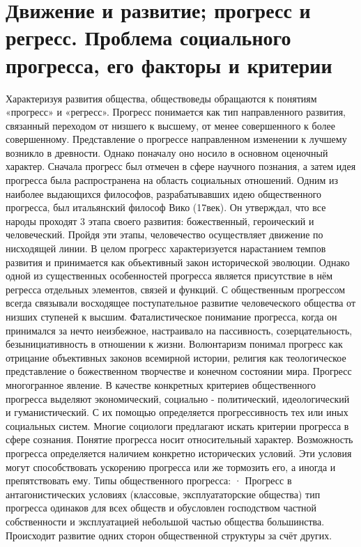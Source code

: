 \documentclass[12pt]{article}
\begin{document}
\newpage
\section{Движение и развитие; прогресс и регресс. Проблема социального прогресса, его факторы и критерии}
Характеризуя развития общества, обществоведы обращаются к понятиям «прогресс» и «регресс». Прогресс
понимается как тип направленного развития, связанный переходом от низшего к высшему, от менее
совершенного к более совершенному. Представление о прогрессе направленном изменении к лучшему
возникло в древности. Однако поначалу оно носило в основном оценочный характер. Сначала прогресс был
отмечен в сфере научного познания, а затем идея прогресса была распространена на область социальных
отношений. Одним из наиболее выдающихся философов, разрабатывавших идею общественного прогресса,
был итальянский философ Вико (17век). Он утверждал, что все народы проходят 3 этапа своего развития:
божественный, героический и человеческий. Пройдя эти этапы, человечество осуществляет движение по
нисходящей линии. В целом прогресс характеризуется нарастанием темпов развития и принимается как
объективный закон исторической эволюции. Однако одной из существенных особенностей прогресса является
присутствие в нём регресса отдельных элементов, связей и функций. С общественным прогрессом всегда
связывали восходящее поступательное развитие человеческого общества от низших ступеней к высшим.
Фаталистическое понимание прогресса, когда он принимался за нечто неизбежное, настраивало на
пассивность, созерцательность, безынициативность в отношении к жизни. Волюнтаризм понимал прогресс как
отрицание объективных законов всемирной истории, религия как теологическое представление о
божественном творчестве и конечном состоянии мира. Прогресс многогранное явление. В качестве
конкретных критериев общественного прогресса выделяют экономический, социально - политический,
идеологический и гуманистический. С их помощью определяется прогрессивность тех или иных социальных 
систем. Многие социологи предлагают искать критерии прогресса в сфере сознания. Понятие прогресса носит
относительный характер. Возможность прогресса определяется наличием конкретно исторических условий.
Эти условия могут способствовать ускорению прогресса или же тормозить его, а иногда и препятствовать ему.
Типы общественного прогресса:
· Прогресс в антагонистических условиях (классовые, эксплуататорские общества) тип прогресса одинаков для
всех обществ и обусловлен господством частной собственности и эксплуатацией небольшой частью общества
большинства. Происходит развитие одних сторон общественной структуры за счёт других.
\end{document}
